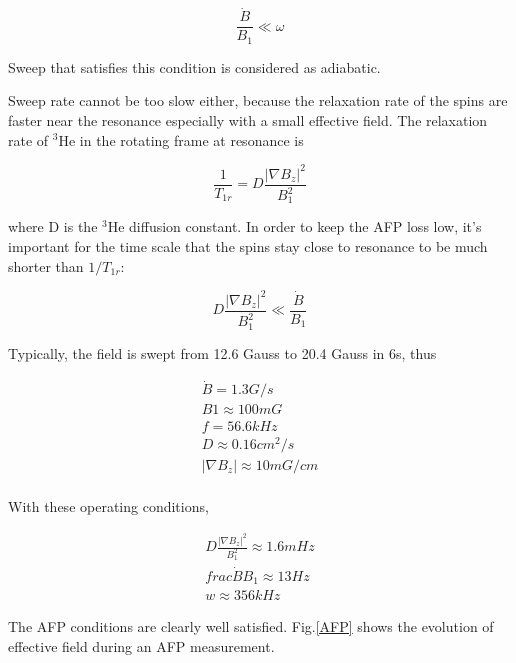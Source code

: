 \begin{equation}
\frac{\dot B}{B_{1}}\ll \omega
\end{equation}

Sweep that satisfies this condition is considered as adiabatic.

Sweep rate cannot be too slow either, because the relaxation rate of the spins are faster near the resonance especially with a small effective field. The relaxation rate of $^{3}$He in the rotating frame at resonance is 

\begin{equation}
\frac{1}{T_{1r}}=D\frac{|\nabla B_{z}|^{2}}{B_{1}^{2}} 
\end{equation}

where D is the $^{3}$He diffusion constant. In order to keep the AFP loss low, it's important for the time scale that the spins stay close to resonance to be much shorter than $1/T_{1r}$:

\begin{equation}
D\frac{|\nabla B_{z}|^{2}}{B_{1}^{2}} \ll \frac{\dot B}{B_{1}}
\end{equation}

Typically, the field is swept from 12.6 Gauss to 20.4 Gauss in 6s, thus

\begin{subequations}
	\begin{gather}
	\dot B = 1.3G/s\\
	B1 \approx 100mG\\
	f = 56.6kHz\\
	D \approx 0.16cm^2/s\\
	|\nabla B_{z}| \approx 10mG/cm\\
	\end{gather}
\end{subequations}

With these operating conditions, 

\begin{subequations}
	\begin{gather}
	D\frac{|\nabla B_{z}|^{2}}{B_{1}^{2}} \approx 1.6mHz\\
	frac{\dot B}{B_{1}} \approx 13Hz\\
	w \approx 356kHz
	\end{gather}
\end{subequations}

The AFP conditions are clearly well satisfied. Fig.\ref{AFP} shows the evolution of effective field during an AFP measurement.


